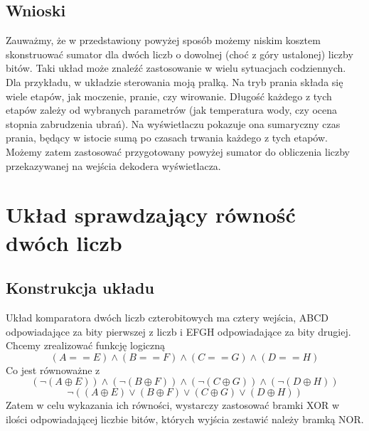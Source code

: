 \documentclass{article}
\begin{document}
            
        \subsection{Wnioski}
            Zauważmy, że w przedstawiony powyżej sposób możemy niskim kosztem skonstruować sumator dla dwóch liczb o dowolnej (choć z góry ustalonej) liczby bitów. Taki układ może znaleźć zastosowanie w wielu sytuacjach codziennych. Dla przykładu, w układzie sterowania moją pralką. Na tryb prania składa się wiele etapów, jak moczenie, pranie, czy wirowanie. Długość każdego z tych etapów zależy od wybranych parametrów (jak temperatura wody, czy ocena stopnia zabrudzenia ubrań). Na wyświetlaczu pokazuje ona sumaryczny czas prania, będący w istocie sumą po czasach trwania każdego z tych etapów. Możemy zatem zastosować przygotowany powyżej sumator do obliczenia liczby przekazywanej na wejścia dekodera wyświetlacza. 
            
            
    \section{Układ sprawdzający równość dwóch liczb}
        \subsection{Konstrukcja układu}
            Układ komparatora dwóch liczb czterobitowych ma cztery wejścia, ABCD odpowiadające za bity pierwszej z liczb i EFGH odpowiadające za bity drugiej. Chcemy zrealizować funkcję logiczną 
            $$(A==E)\land(B==F)\land(C==G)\land(D==H)$$
            Co jest równoważne z
            $$(\neg(A\oplus E))\land(\neg(B\oplus F))\land(\neg(C\oplus G))\land(\neg(D\oplus H))$$
            $$\neg((A\oplus E)\lor(B\oplus F)\lor(C\oplus G)\lor(D\oplus H))$$
            Zatem w celu wykazania ich równości, wystarczy zastosować bramki XOR w ilości odpowiadającej liczbie bitów, których wyjścia zestawić należy bramką NOR. 
\end{document}
